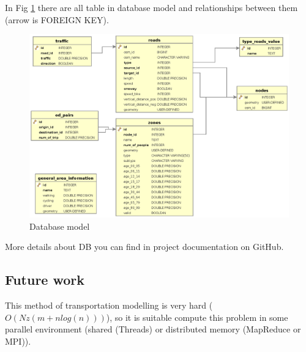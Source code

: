 In Fig \ref{img.schema} there are all table in database model and relationships between them (arrow is FOREIGN KEY).

\begin{figure}
\centering
\includegraphics[width=15cm]{img/c01-transp-model/db.eps}
\caption{Database model}
\label{img.schema}
\end{figure}

More details about DB you can find in project documentation on GitHub.

\subsection{Future work}
This method of transportation modelling is very hard ($O(N z (m + n log(n)))$), so it is suitable compute this problem in some parallel environment (shared (Threads) or distributed memory (MapReduce or MPI)).

